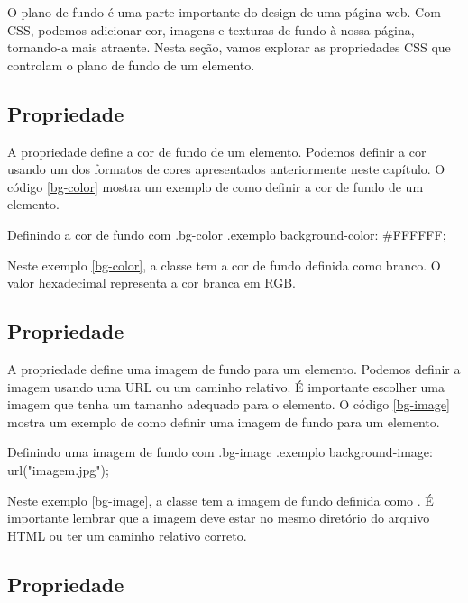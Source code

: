 O plano de fundo é uma parte importante do design de uma página web. Com CSS, podemos adicionar cor, imagens e texturas de fundo à nossa página, tornando-a mais atraente. Nesta seção, vamos explorar as propriedades CSS que controlam o plano de fundo de um elemento.

\subsection{Propriedade }

A propriedade  define a cor de fundo de um elemento. Podemos definir a cor usando um dos formatos de cores apresentados anteriormente neste capítulo. O código \ref{bg-color} mostra um exemplo de como definir a cor de fundo de um elemento.

\begin{csscode}{Definindo a cor de fundo com .}{bg-color}
.exemplo {
    background-color: #FFFFFF;
}
\end{csscode}

Neste exemplo \ref{bg-color}, a classe  tem a cor de fundo definida como branco. O valor hexadecimal  representa a cor branca em RGB.

\subsection{Propriedade }

A propriedade  define uma imagem de fundo para um elemento. Podemos definir a imagem usando uma URL ou um caminho relativo. É importante escolher uma imagem que tenha um tamanho adequado para o elemento. O código \ref{bg-image} mostra um exemplo de como definir uma imagem de fundo para um elemento.

\begin{csscode}{Definindo uma imagem de fundo com .}{bg-image}
.exemplo {
    background-image: url("imagem.jpg");
}
\end{csscode}

Neste exemplo \ref{bg-image}, a classe  tem a imagem de fundo definida como . É importante lembrar que a imagem deve estar no mesmo diretório do arquivo HTML ou ter um caminho relativo correto.

\subsection{Propriedade }

